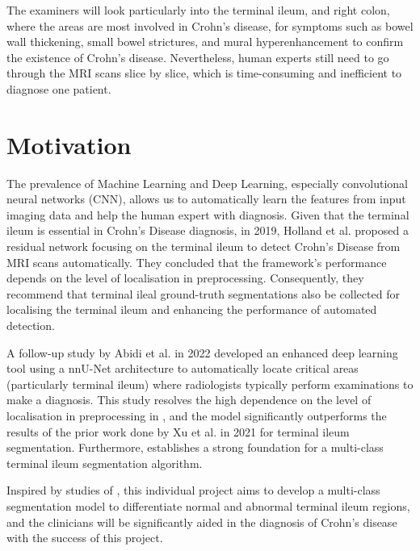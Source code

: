 \noindent The examiners will look particularly into the terminal ileum, and right colon, where the areas are most involved in Crohn's disease, for symptoms such as bowel wall thickening, small bowel strictures, and mural hyperenhancement \cite{bruining2018consensus} to confirm the existence of Crohn's disease. Nevertheless, human experts still need to go through the MRI scans slice by slice, which is time-consuming and inefficient to diagnose one patient. 
\section{Motivation}
The prevalence of Machine Learning and Deep Learning, especially convolutional neural networks (CNN), allows us to automatically learn the features from input imaging data and help the human expert with diagnosis. Given that the terminal ileum is essential in Crohn's Disease diagnosis, in 2019, Holland et al. \cite{holland2019automatic} proposed a residual network focusing on the terminal ileum to detect Crohn's Disease from MRI scans automatically. They concluded that the framework's performance depends on the level of localisation in preprocessing. Consequently, they recommend that terminal ileal ground-truth segmentations also be collected for localising the terminal ileum and enhancing the performance of automated detection. \medskip

\noindent A follow-up study by Abidi et al. \cite{Ali2022} in 2022 developed an enhanced deep learning tool using a nnU-Net architecture to automatically locate critical areas (particularly terminal ileum) where radiologists typically perform examinations to make a diagnosis. This study resolves the high dependence on the level of localisation in preprocessing in \cite{holland2019automatic}, and the model significantly outperforms the results of the prior work done by Xu et al. \cite{KeXu2021} in 2021 for terminal ileum segmentation. Furthermore, \cite{Ali2022} establishes a strong foundation for a multi-class terminal ileum segmentation algorithm. \medskip

\noindent Inspired by studies of \cite{holland2019automatic, KeXu2021, Ali2022}, this individual project aims to develop a multi-class segmentation model to differentiate normal and abnormal terminal ileum regions, and the clinicians will be significantly aided in the diagnosis of Crohn's disease with the success of this project.

